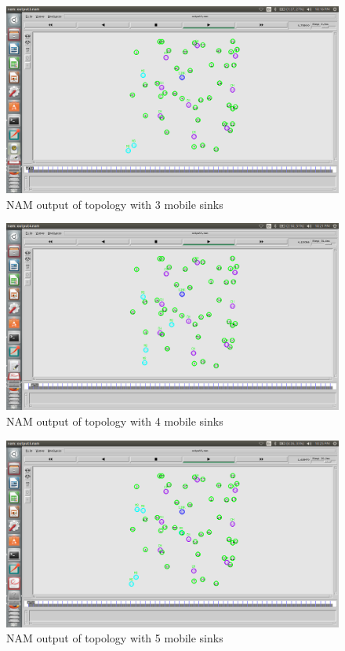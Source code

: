 \documentclass[MTech]{iitmdiss}
\begin{document}
\pagebreak
{}
\pagestyle{fancy}
\lhead{}
\cfoot{\thepage}
\renewcommand{\footrulewidth}{1pt}
\renewcommand{\headrulewidth}{1pt}
\setlength{\headsep}{0.5in}
\begin{figure}[ht!]
\centering
\includegraphics[scale=0.25]{3sink.PNG}
\caption{NAM output of topology with 3 mobile sinks\label{overflow}}
\label{f8}
\end{figure}
\begin{figure}[h]
\centering
\includegraphics[scale=0.25]{4sink.PNG}
\caption{NAM output of topology with 4 mobile sinks\label{overflow}}
\label{f9}
\end{figure}
\begin{figure}[ht!]
\centering
\includegraphics[scale=0.25]{5sink.PNG}
\caption{NAM output of topology with 5 mobile sinks\label{overflow}}
\label{f10}
\end{figure}
\end{document}
